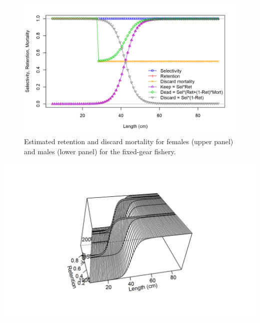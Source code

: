 \documentclass[11pt,
  english,
  a4paper,
]{article}
\begin{document}
\begin{figure}
\centering
\includegraphics[width=1\textwidth,height=1\textheight]{figs/sel09_len_flt3sex2.png}
\caption{Estimated retention and discard mortality for females (upper panel) and males (lower panel) for the fixed-gear fishery.\label{fig:selectivityatageTWL}}
\end{figure}

\tagmcend\tagstructend

\clearpage


\includegraphics[width=1\textwidth,height=1\textheight]{figs/sel05_timevary_ret_surf_flt3sex1.png}

\tagmcend\tagstructend

\end{document}
